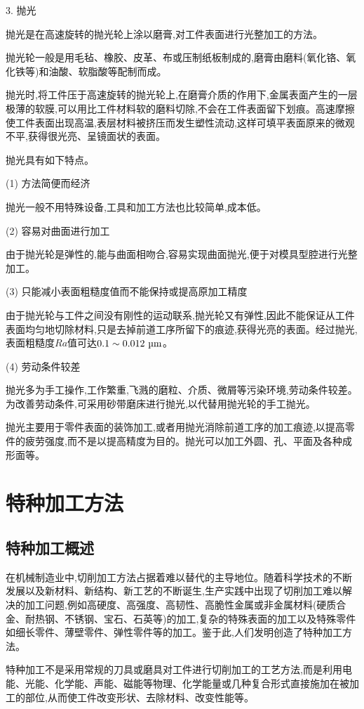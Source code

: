 \documentclass[UTF8]{ctexbook}
\newcommand{\◎}{\ensuremath{\bigcirc}}
\begin{document}
3. 抛光

抛光是在高速旋转的抛光轮上涂以磨膏,对工件表面进行光整加工的方法。

抛光轮一般是用毛毡、橡胶、皮革、布或压制纸板制成的,磨膏由磨料(氧化铬、氧化铁等)和油酸、软脂酸等配制而成。

抛光时,将工件压于高速旋转的抛光轮上,在磨膏介质的作用下,金属表面产生的一层极薄的软膜,可以用比工件材料软的磨料切除,不会在工件表面留下划痕。高速摩擦使工件表面出现高温,表层材料被挤压而发生塑性流动,这样可填平表面原来的微观不平,获得很光亮、呈镜面状的表面。

抛光具有如下特点。

(1) 方法简便而经济

抛光一般不用特殊设备,工具和加工方法也比较简单,成本低。

(2) 容易对曲面进行加工

由于抛光轮是弹性的,能与曲面相吻合,容易实现曲面抛光,便于对模具型腔进行光整加工。

(3) 只能减小表面粗糙度值而不能保持或提高原加工精度

由于抛光轮与工件之间没有刚性的运动联系,抛光轮又有弹性,因此不能保证从工件表面均匀地切除材料,只是去掉前道工序所留下的痕迹,获得光亮的表面。经过抛光,表面粗糙度$Ra$值可达$0.1 \sim 0.012 \text{ \textmu m}$。

(4) 劳动条件较差

抛光多为手工操作,工作繁重,飞溅的磨粒、介质、微屑等污染环境,劳动条件较差。为改善劳动条件,可采用砂带磨床进行抛光,以代替用抛光轮的手工抛光。

抛光主要用于零件表面的装饰加工,或者用抛光消除前道工序的加工痕迹,以提高零件的疲劳强度,而不是以提高精度为目的。抛光可以加工外圆、孔、平面及各种成形面等。

\section{特种加工方法}

\subsection{特种加工概述}
在机械制造业中,切削加工方法占据着难以替代的主导地位。随着科学技术的不断发展以及新材料、新结构、新工艺的不断诞生,生产实践中出现了切削加工难以解决的加工问题,例如高硬度、高强度、高韧性、高脆性金属或非金属材料(硬质合金、耐热钢、不锈钢、宝石、石英等)的加工,复杂的特殊表面的加工以及特殊零件如细长零件、薄壁零件、弹性零件等的加工。鉴于此,人们发明创造了特种加工方法。

特种加工不是采用常规的刀具或磨具对工件进行切削加工的工艺方法,而是利用电能、光能、化学能、声能、磁能等物理、化学能量或几种复合形式直接施加在被加工的部位,从而使工件改变形状、去除材料、改变性能等。
\end{document}
